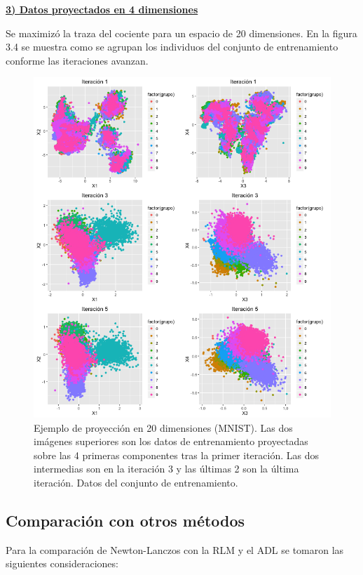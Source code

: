 \underline{\textbf{3) Datos proyectados en 4 dimensiones}}

Se maximizó la traza del cociente para un espacio de 20 dimensiones. En la figura 3.4 se muestra como se agrupan los individuos del conjunto de entrenamiento conforme las iteraciones avanzan. 
  
\begin{figure}[!ht] \label{fig5.4}
  \centering
	\includegraphics[width=1\textwidth]{Figures/Chapter4_ejemplo20componentes.png}	
  \caption[Ejemplo de proyección en 20 dimensiones (MNIST).]
  {Ejemplo de proyección en 20 dimensiones (MNIST). Las dos imágenes superiores son los datos de entrenamiento proyectadas sobre las 4 primeras componentes tras la primer iteración. Las dos intermedias son en la iteración 3 y las últimas 2 son la última iteración. Datos del conjunto de entrenamiento.}
\end{figure}

\subsection{Comparación con otros métodos}

Para la comparación de Newton-Lanczos con la RLM y el ADL se tomaron las siguientes consideraciones:

